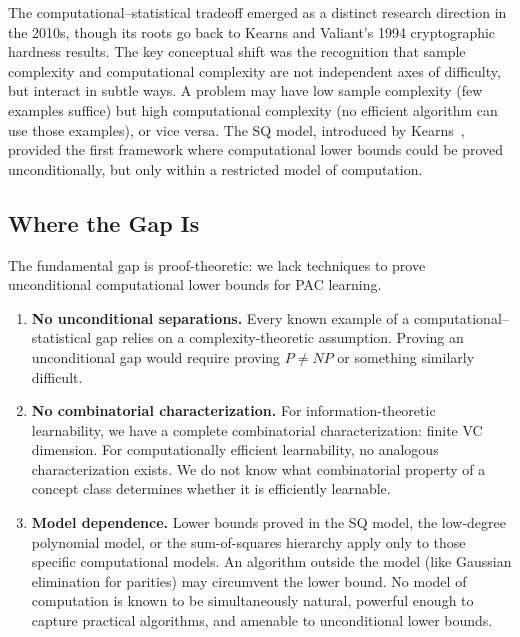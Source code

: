\begin{historical}
The computational--statistical tradeoff emerged as a distinct research
direction in the 2010s, though its roots go back to Kearns and Valiant's
1994 cryptographic hardness results.  The key conceptual shift was the
recognition that sample complexity and computational complexity are not
independent axes of difficulty, but interact in subtle ways.  A problem
may have low sample complexity (few examples suffice) but high
computational complexity (no efficient algorithm can use those examples),
or vice versa.  The SQ model, introduced by Kearns~\cite{Kearns1998},
provided the first framework where computational lower bounds could be
proved unconditionally, but only within a restricted model of computation.
\end{historical}

\subsection{Where the Gap Is}

The fundamental gap is proof-theoretic: we lack techniques to prove
unconditional computational lower bounds for PAC learning.

\begin{enumerate}[leftmargin=*]
\item \textbf{No unconditional separations.}  Every known example of a
  computational--statistical gap relies on a complexity-theoretic assumption.
  Proving an unconditional gap would require proving $P \neq NP$ or something
  similarly difficult.

\item \textbf{No combinatorial characterization.}  For information-theoretic
  learnability, we have a complete combinatorial characterization: finite VC
  dimension.  For computationally efficient learnability, no analogous
  characterization exists.  We do not know what combinatorial property of a
  concept class determines whether it is efficiently learnable.

\item \textbf{Model dependence.}  Lower bounds proved in the SQ model, the
  low-degree polynomial model, or the sum-of-squares hierarchy apply only to
  those specific computational models.  An algorithm outside the model
  (like Gaussian elimination for parities) may circumvent the lower bound.
  No model of computation is known to be simultaneously natural, powerful
  enough to capture practical algorithms, and amenable to unconditional lower
  bounds.
\end{enumerate}

